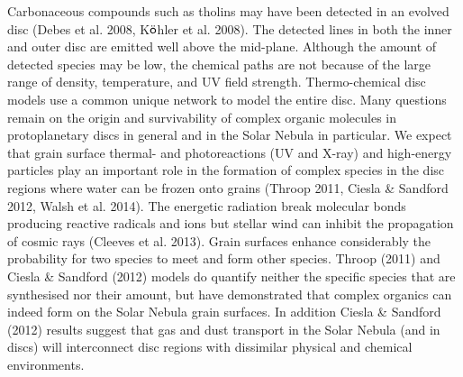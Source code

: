 \documentclass[10pt,fleqn,twoside]{article}
\begin{document}
Carbonaceous compounds such as tholins may have been detected in an evolved disc (Debes et al. 2008, K$\ddot{\textsf o}$hler et al. 2008). The detected lines in both the inner and outer disc are emitted well above the mid-plane. Although the amount of detected species may be low, the chemical paths are not because of the large range of density, temperature, and UV field strength. Thermo-chemical disc models use a common unique network to model the entire disc. Many questions remain on the origin and survivability of complex organic molecules in protoplanetary discs in general and in the Solar Nebula in particular. We expect that grain surface thermal- and photoreactions (UV and X-ray) and high-energy particles play an important role in the formation of complex species in the disc regions where water can be frozen onto grains (Throop 2011, Ciesla \& Sandford 2012, Walsh et al. 2014). The energetic radiation break molecular bonds producing reactive radicals and ions but stellar wind can inhibit the propagation of cosmic rays (Cleeves et al. 2013). Grain surfaces enhance considerably the probability for two species to meet and form other species. Throop (2011) and Ciesla \& Sandford (2012) models do quantify neither the specific species that are synthesised nor their amount, but have demonstrated that complex organics can indeed form on the Solar Nebula grain surfaces. In addition Ciesla \& Sandford (2012) results suggest that gas and dust transport in the Solar Nebula (and in discs) will interconnect disc regions with dissimilar physical and chemical environments.
\end{document}
